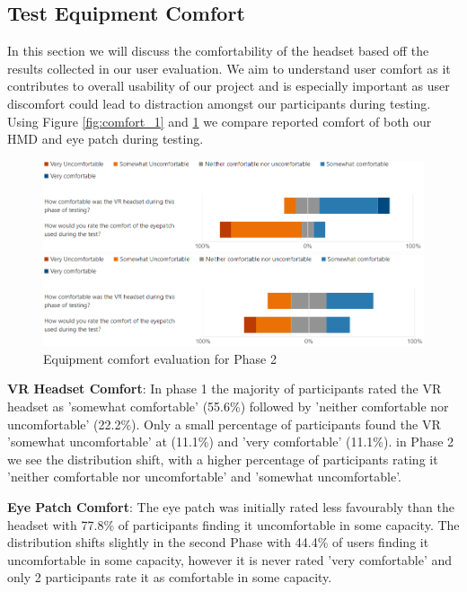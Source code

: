 \documentclass{l4proj}
\begin{document}
\subsection{Test Equipment Comfort}
In this section we will discuss the comfortability of the headset based off the results collected in our user evaluation. We aim to understand user comfort as it contributes to overall usability of our project and is especially important as user discomfort could lead to distraction amongst our participants during testing. Using Figure \ref{fig:comfort_1} and \ref{fig:comfort_2} we compare reported comfort of both our HMD and eye patch during testing.
\begin{figure}[htbp]
    \centering
    \includegraphics[width=0.9\linewidth]{dissertation/images/Comfort_Part_1.png}    
    \caption{Equipment comfort evaluation for Phase 1} \label{fig:comfort_1}
    
    \vspace{1cm}
    
    \includegraphics[width=0.9\linewidth]{dissertation/images/Comfort_Part_2.png}    
    \caption{Equipment comfort evaluation for Phase 2} \label{fig:comfort_2}
\end{figure}
\newline
\textbf{VR Headset Comfort}: In phase 1 the majority of participants rated the VR headset as 'somewhat comfortable' (55.6\%) followed by 'neither comfortable nor uncomfortable' (22.2\%). Only a small percentage of participants found the VR 'somewhat uncomfortable' at (11.1\%) and 'very comfortable' (11.1\%). in Phase 2 we see the distribution shift, with a higher percentage of participants rating it 'neither comfortable nor uncomfortable' and 'somewhat uncomfortable'. 

\textbf{Eye Patch Comfort}: The eye patch was initially rated less favourably than the headset with 77.8\% of participants finding it uncomfortable in some capacity. The distribution shifts slightly in the second Phase with 44.4\% of users finding it uncomfortable in some capacity, however it is never rated 'very comfortable' and only 2 participants rate it as comfortable in some capacity. 
\end{document}
